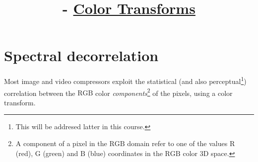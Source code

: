 
%


\title{\SM{} - \href{https://sistemas-multimedia.github.io/contents/color_transforms}{Color Transforms}}

\maketitle
\tableofcontents

\section{Spectral decorrelation}

Most image and video compressors exploit the statistical (and also
perceptual\footnote{This will be addresed latter in this course.})
correlation between the $\text{RGB}$ color
\emph{components}\footnote{A component of a pixel in the $\text{RGB}$
domain refer to one of the values $\text{R}$ (red), $\text{G}$ (green)
and $\text{B}$ (blue) coordinates in the $\text{RGB}$ color 3D space.}
of the pixels, using a color transform.


